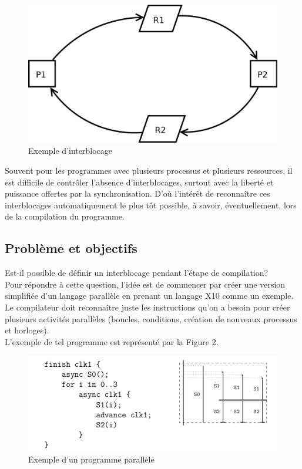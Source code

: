 \documentclass[12pt]{scrartcl}
\begin{document}
\begin{figure}[h]
  \includegraphics[scale=0.2]{deadlock}
  \centering
  \caption{Exemple d'interblocage}
  \centering
\end{figure}

Souvent pour les programmes avec plusieurs processus et plusieurs ressources, il est difficile de contrôler l'absence d'interblocages, surtout avec la liberté et puissance offertes par la synchronisation.
D'où l'intérêt de reconnaître ces interblocages automatiquement le plus tôt possible, à savoir, éventuellement, lors de la compilation du programme.

\newpage

\subsection{Problème et objectifs}

Est-il possible de définir un interblocage pendant l'étape de compilation?\\

 Pour répondre à cette question, l'idée est de commencer par créer une version simplifiée d'un langage parallèle en prenant un langage X10 comme un exemple.
 Le compilateur doit reconnaître juste les instructions qu'on a besoin pour créer plusieurs activités parallèles (boucles, conditions, création de nouveaux processus et horloges).\\
 L'exemple de tel programme est représenté par la Figure 2.

 \begin{figure}[h]
  \includegraphics[scale=1]{program}
  \centering
  \caption{Exemple d'un programme parallèle}
  \centering
\end{figure}
\end{document}
